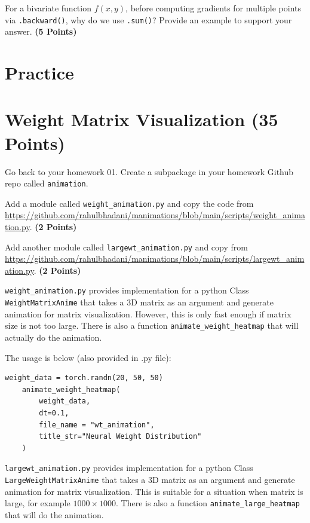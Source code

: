 \documentclass[12pt, xcolor=dvipsnames,svgnames,x11names]{article}
\begin{document}
For a bivariate function $f(x,y)$, before computing gradients for multiple points via \texttt{.backward()}, why do we use \texttt{.sum()}? Provide an example to support your answer. \hfill \textbf{(5 Points)}


\section*{Practice}

\section{Weight Matrix Visualization (35 Points)}
Go back to your homework 01. Create a subpackage in your homework Github repo called \texttt{animation}.

Add a module called \texttt{weight\_animation.py} and copy the code from \url{https://github.com/rahulbhadani/manimations/blob/main/scripts/weight_animation.py}. \hfill \textbf{(2 Points)}

Add another module called \texttt{largewt\_animation.py} and copy from \url{https://github.com/rahulbhadani/manimations/blob/main/scripts/largewt_animation.py}. \hfill \textbf{(2 Points)}


\texttt{weight\_animation.py} provides implementation for a python Class \texttt{WeightMatrixAnime} that takes a 3D matrix as an argument and generate animation for matrix visualization. However, this is only fast enough if matrix size is not too large. There is also a function \texttt{animate_weight_heatmap} that will actually do the animation.

The usage is below (also provided in .py file):

\begin{verbatim}
weight_data = torch.randn(20, 50, 50)
    animate_weight_heatmap(
        weight_data, 
        dt=0.1,
        file_name = "wt_animation",
        title_str="Neural Weight Distribution"
    )

\end{verbatim}


\texttt{largewt\_animation.py} provides implementation for a python Class \texttt{LargeWeightMatrixAnime} that takes a 3D matrix as an argument and generate animation for matrix visualization. This is suitable for a situation when matrix is large, for example $1000\times 1000$.  There is also a function \texttt{animate_large_heatmap} that will do the animation.
\end{document}
